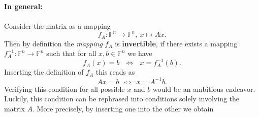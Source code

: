 \begin{frame}
	\textbf{In general:}\\~\\
	Consider the matrix as a mapping $$f_A:\mathbb{F}^n\rightarrow\mathbb{F}^n,~x\mapsto Ax.$$
	Then by definition the \textit{mapping} $f_A$ is \textbf{\color{defgruen}invertible}, if there exists a mapping $f_A^{-1}:\mathbb{F}^n\rightarrow\mathbb{F}^n$ such that for all $x,b \in \mathbb{F}^n$
	we have 
	$$f_A(x)=b~~~\Leftrightarrow~~~x=f_{A}^{-1}(b).$$
	Inserting the definition of $f_A$ this reads as
	$$Ax=b~~\Leftrightarrow~~x=A^{-1}b.$$
	Verifying this condition for all possible $x$ and $b$ would be an ambitious endeavor. Luckily, this condition can be rephrased into conditions solely involving the matrix $A$. More precisely, by inserting one into the other we obtain
\end{frame}



